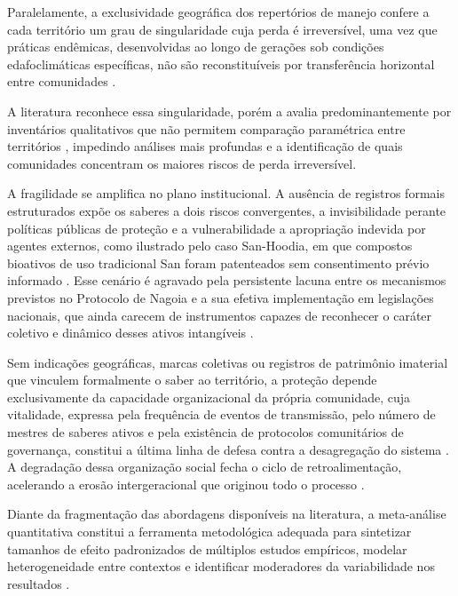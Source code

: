 \documentclass[12pt,a4paper]{article}
\begin{document}
Paralelamente, a exclusividade geográfica dos repertórios de manejo confere a cada território um grau de singularidade cuja perda é irreversível, uma vez que práticas endêmicas, desenvolvidas ao longo de gerações sob condições edafoclimáticas específicas, não são reconstituíveis por transferência horizontal entre comunidades \citep{Laborde2023,Ens2016}. 

A literatura reconhece essa singularidade, porém a avalia predominantemente por inventários qualitativos que não permitem comparação paramétrica entre territórios \citep{CalvetMir2016,LaRosa2021,Saiba2023}, impedindo análises mais profundas e a identificação de quais comunidades concentram os maiores riscos de perda irreversível.

A fragilidade se amplifica no plano institucional. A ausência de registros formais estruturados expõe os saberes a dois riscos convergentes, a invisibilidade perante políticas públicas de proteção \citep{Santilli2009} e a vulnerabilidade a apropriação indevida por agentes externos, como ilustrado pelo caso San-Hoodia, em que compostos bioativos de uso tradicional San foram patenteados sem consentimento prévio informado \citep{Wynberg2015}. Esse cenário é agravado pela persistente lacuna entre os mecanismos previstos no Protocolo de Nagoia e a sua efetiva implementação em legislações nacionais, que ainda carecem de instrumentos capazes de reconhecer o caráter coletivo e dinâmico desses ativos intangíveis \citep{Laird2020}.

Sem indicações geográficas, marcas coletivas ou registros de patrimônio imaterial que vinculem formalmente o saber ao território, a proteção depende exclusivamente da capacidade organizacional da própria comunidade, cuja vitalidade, expressa pela frequência de eventos de transmissão, pelo número de mestres de saberes ativos e pela existência de protocolos comunitários de governança, constitui a última linha de defesa contra a desagregação do sistema \citep{FalsBorda1991,Ostrom1990}. A degradação dessa organização social fecha o ciclo de retroalimentação, acelerando a erosão intergeracional que originou todo o processo \citep{Agrawal2002}.

Diante da fragmentação das abordagens disponíveis na literatura, a meta-análise quantitativa constitui a ferramenta metodológica adequada para sintetizar tamanhos de efeito padronizados de múltiplos estudos empíricos, modelar heterogeneidade entre contextos e identificar moderadores da variabilidade nos resultados \citep{Borenstein2009}.
\end{document}
